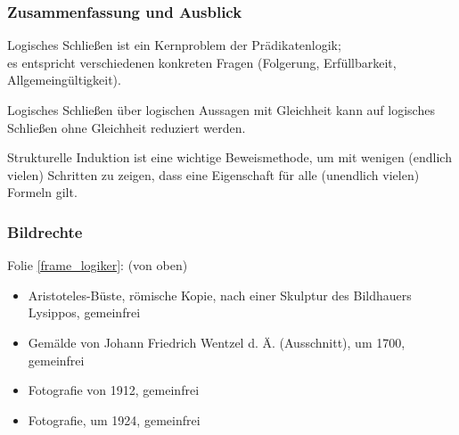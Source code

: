 \documentclass[aspectratio=1610,onlymath]{beamer}
\begin{document}
\begin{frame}\frametitle{Zusammenfassung und Ausblick}

Logisches Schließen ist ein Kernproblem der Prädikatenlogik;\\
es entspricht verschiedenen konkreten Fragen (Folgerung, Erfüllbarkeit, Allgemeingültigkeit).
\bigskip

Logisches Schließen über logischen Aussagen mit Gleichheit kann
auf logisches Schließen ohne Gleichheit reduziert werden.\bigskip

Strukturelle Induktion ist eine wichtige Beweismethode, um mit wenigen (endlich vielen) Schritten zu zeigen, dass eine Eigenschaft für alle (unendlich vielen) Formeln gilt.\bigskip



\end{frame}




\begin{frame}[t]\frametitle{Bildrechte}

Folie \ref{frame_logiker}: (von oben)
\begin{itemize}
\item Aristoteles-Büste, römische Kopie, nach einer Skulptur des Bildhauers Lysippos, gemeinfrei
\item Gemälde von Johann Friedrich Wentzel d. Ä. (Ausschnitt), um 1700, gemeinfrei
\item Fotografie von 1912, gemeinfrei
\item Fotografie, um 1924, gemeinfrei
\end{itemize}

\end{frame}
\end{document}
